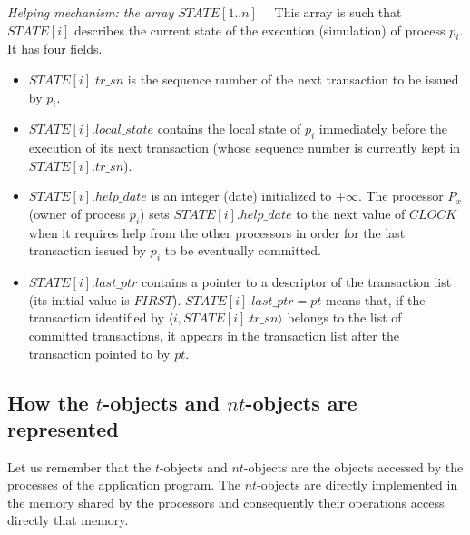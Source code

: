 \noindent
{\it Helping mechanism: the array $\mathit{STATE}[1..n]$}~~
This array  is  such that $\mathit{STATE}[i]$ describes the current state 
of the execution (simulation)  of process $p_i$. It has four fields.  
\begin{itemize}
\item  
$\mathit{STATE}[i].tr\_sn$ is the sequence number of 
the next  transaction to be issued by $p_i$. 
%
\item  $\mathit{STATE}[i].local\_state$ contains the local state of $p_i$
immediately before the execution of its next transaction (whose sequence 
number is currently  kept  in $\mathit{STATE}[i].tr\_sn$). 
%
\item 
$\mathit{STATE}[i].help\_date$ is an integer (date) initialized to $+\infty$. 
The processor $P_x$ (owner of process $p_i$) sets 
$\mathit{STATE}[i].help\_date$ to  the next value  of $\mathit{CLOCK}$ when
it requires help from  the other processors  in order for the last transaction 
issued by $p_i$ to be eventually committed. 
%
\item  $\mathit{STATE}[i].last\_ptr$ contains a pointer to a
descriptor of the transaction list (its initial value is  $\mathit{FIRST}$). 
$\mathit{STATE}[i].last\_ptr=pt$  means that, if 
the transaction identified by  $\langle i,\mathit{STATE}[i].tr\_sn\rangle$ 
belongs  to  the  list  of  committed  transactions,  it appears in the transaction list after  the
transaction pointed to by $pt$.  
\end{itemize}

\subsection{How  the $t$-objects and $nt$-objects are represented}
Let us remember that the $t$-objects  and  $nt$-objects are the objects 
accessed by  the processes of the application program.  
The $nt$-objects are directly implemented in the  memory shared by the 
processors and consequently their operations access directly that memory.  

